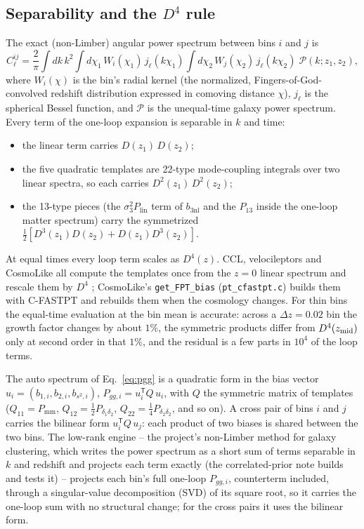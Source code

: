 \documentclass[11pt]{article}
\newcommand{\bthree}{b_{3\mathrm{nl}}} %
\newcommand{\plin}{P_{\mathrm{lin}}}
\newcommand{\pnl}{P_{\mathrm{mm}}}
\begin{document}
\subsection{Separability and the \texorpdfstring{$D^4$}{D\textasciicircum 4} rule}
\label{sec:separability}

The exact (non-Limber) angular power spectrum between bins $i$ and $j$
is
\begin{equation}
C_\ell^{ij} = \frac{2}{\pi} \int dk\,k^2
 \int d\chi_1\,W_i(\chi_1)\,j_\ell(k\chi_1)
 \int d\chi_2\,W_j(\chi_2)\,j_\ell(k\chi_2)\;
 \mathcal{P}\!\left(k; z_1, z_2\right) ,
\label{eq:cl}
\end{equation}
where $W_i(\chi)$ is the bin's radial kernel (the normalized,
Fingers-of-God-convolved redshift distribution expressed in comoving
distance $\chi$), $j_\ell$ is the spherical Bessel function, and
$\mathcal{P}$ is the unequal-time galaxy power spectrum.  Every term of
the one-loop expansion is separable in $k$ and time:
\begin{itemize}
\item the linear term carries $D(z_1)\,D(z_2)$;
\item the five quadratic templates are 22-type mode-coupling integrals
over two linear spectra, so each carries $D^2(z_1)\,D^2(z_2)$;
\item the 13-type pieces (the $\sigma_3^2\plin$ term of $\bthree$ and
the $P_{13}$ inside the one-loop matter spectrum) carry the symmetrized
$\tfrac{1}{2}\left[D^3(z_1)D(z_2) + D(z_1)D^3(z_2)\right]$.
\end{itemize}
At equal times every loop term scales as $D^4(z)$.  CCL, velocileptors
and CosmoLike all compute the templates once from the $z = 0$ linear
spectrum and rescale them by $D^4$ \cite{DESI2024VII}; CosmoLike's
\texttt{get\_FPT\_bias} (\texttt{pt\_cfastpt.c}) builds them with
C-FASTPT and rebuilds them when the cosmology changes.  For thin bins
the equal-time evaluation at the bin mean is accurate: across a
$\Delta z = 0.02$ bin the growth factor changes by about $1\%$, the
symmetric products differ from $D^4(z_{\rm mid})$ only at second order
in that $1\%$, and the residual is a few parts in $10^4$ of the loop
terms.

The auto spectrum of Eq.~\eqref{eq:pgg} is a quadratic form in the
bias vector $u_i = (b_{1,i}, b_{2,i}, b_{s^2,i})$,
$P_{gg,i} = u_i^{\mathsf T} Q\, u_i$, with $Q$ the symmetric matrix of
templates ($Q_{11} = \pnl$, $Q_{12} = \tfrac12 P_{\delta_1\delta_2}$,
$Q_{22} = \tfrac14 P_{\delta_2\delta_2}$, and so on).  A cross pair of
bins $i$ and $j$ carries the bilinear form $u_i^{\mathsf T} Q\, u_j$:
each product of two biases is shared between the two bins.  The
low-rank engine -- the project's non-Limber method for galaxy
clustering, which writes the power spectrum as a short sum of terms
separable in $k$ and redshift and projects each term exactly (the
correlated-prior note builds and tests it) -- projects each bin's
full one-loop $P_{gg,i}$,
counterterm included, through a singular-value decomposition (SVD) of
its square root, so it carries
the one-loop sum with no structural change; for the cross pairs it
uses the bilinear form.
\end{document}
